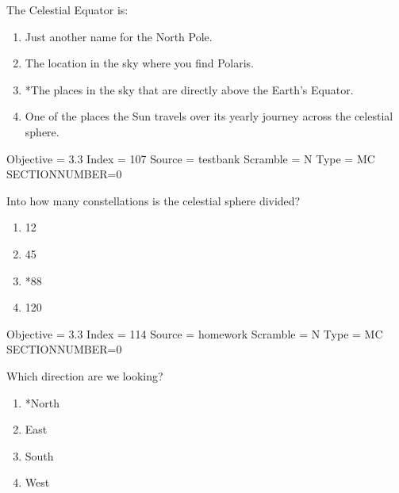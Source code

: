 \documentclass[11pt]{article}
\begin{document}
\begin{enumerate}
\begin{minipage}{\textwidth}
\begin{minipage}{\textwidth}
\item The  Celestial Equator is:
\begin{enumerate} 
\setlength{\itemsep}{1pt} 
\setlength{\parskip}{0pt} 
\setlength{\parsep}{0pt}
\setlength{\multicolsep}{1pt} 
\item Just another name for the North Pole.
\item The location in the sky where you find Polaris.
\item *The places in the sky that are  directly above the Earth's Equator.
\item One of the places the Sun travels over its yearly journey across the celestial sphere.
\end{enumerate} 
Objective = 3.3
Index = 107
Source = testbank
Scramble = N
Type = MC
SECTIONNUMBER=0
\end{minipage}
\end{minipage}
\vskip 0.20in

\begin{minipage}{\textwidth}
\begin{minipage}{\textwidth}
\item Into how many constellations is the celestial sphere divided?
\begin{multicols}{3}
\begin{enumerate} 
\setlength{\itemsep}{1pt} 
\setlength{\parskip}{0pt} 
\setlength{\parsep}{0pt}
\setlength{\multicolsep}{1pt} 
\item 12
\item 45
\item *88
\item 120
\end{enumerate} 
\vfill 
\end{multicols}

Objective = 3.3
Index = 114
Source = homework
Scramble = N
Type = MC
SECTIONNUMBER=0
\end{minipage}
\end{minipage}
\vskip 0.20in

\begin{minipage}{\textwidth}
\begin{minipage}{\textwidth}
\item Which direction are we looking?
\begin{multicols}{3}
\begin{enumerate} 
\setlength{\itemsep}{1pt} 
\setlength{\parskip}{0pt} 
\setlength{\parsep}{0pt}
\setlength{\multicolsep}{1pt} 
\item *North
\item East
\item South
\item West
\end{enumerate} 
\vfill 
\end{multicols}


\end{minipage}
\end{minipage}
\end{enumerate}
\end{document}
